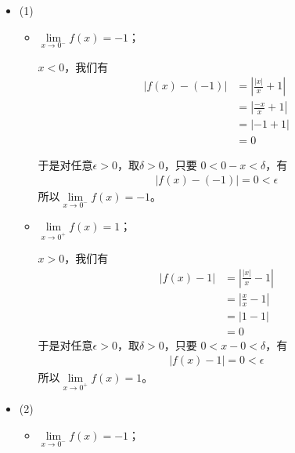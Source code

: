 \documentclass{article}
\begin{document}
\begin{itemize}
  \item (1)

        \begin{itemize}
          \item $\lim\limits_{x \to 0^{-}} f(x) = -1$；

                $x < 0$，我们有
                \begin{align*}
                  |f(x) - (-1)| & = |\frac{|x|}{x} + 1| \\
                                & = |\frac{-x}{x} + 1|  \\
                                & = |-1 + 1|            \\
                                & = 0
                \end{align*}

                于是对任意$\epsilon > 0$，取$\delta > 0$，只要
                $0 < 0 - x < \delta$，有
                \begin{align*}
                  |f(x) - (-1)| = 0 < \epsilon
                \end{align*}
                所以$\lim\limits_{x \to 0^{-}} f(x) = -1$。

          \item $\lim\limits_{x \to 0^{+}} f(x) = 1$；

                $x > 0$，我们有
                \begin{align*}
                  |f(x) - 1| & = |\frac{|x|}{x} - 1| \\
                             & = |\frac{x}{x} - 1|   \\
                             & = |1 - 1|             \\
                             & = 0
                \end{align*}
                于是对任意$\epsilon > 0$，取$\delta > 0$，只要
                $0 < x - 0 < \delta$，有
                \begin{align*}
                  |f(x) - 1| = 0 < \epsilon
                \end{align*}
                所以$\lim\limits_{x \to 0^{+}} f(x) = 1$。
        \end{itemize}

  \item (2)

        \begin{itemize}
          \item $\lim\limits_{x \to 0^{-}} f(x) = -1$；


\end{itemize}
\end{itemize}
\end{document}
